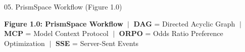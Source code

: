 \documentclass[aspectratio=169,10pt]{beamer}
\begin{document}
\begin{frame}[t]{05. PrismSpace Workflow (Figure 1.0)}
{\begin{tikzpicture}
\end{tikzpicture}%
}
\vspace{0.2em}
\begin{tcolorbox}[
  enhanced, arc=3pt, colframe=lavenderDark!65, colback=lavenderLight!35,
  boxrule=0.6pt, left=4pt, right=4pt, top=1.5pt, bottom=1.5pt
]
\centering\fontsize{4.8}{5.8}\selectfont\color{lavenderDark}
\textbf{Figure 1.0: PrismSpace Workflow} $\;\vert\;$ 
\textbf{DAG} = Directed Acyclic Graph $\;\vert\;$ 
\textbf{MCP} = Model Context Protocol $\;\vert\;$ 
\textbf{ORPO} = Odds Ratio Preference Optimization $\;\vert\;$ 
\textbf{SSE} = Server-Sent Events
\end{tcolorbox}
\end{frame}
\end{document}

